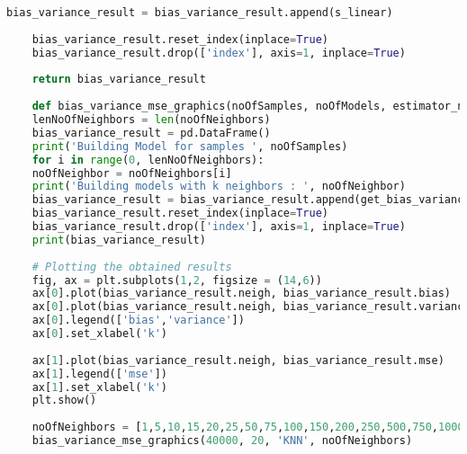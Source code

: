 \documentclass[a4paper]{article}
\begin{document}
\begin{appendices}
\begin{lstlisting}[language=Python]
	bias_variance_result = bias_variance_result.append(s_linear)
	
	bias_variance_result.reset_index(inplace=True)
	bias_variance_result.drop(['index'], axis=1, inplace=True)
	
	return bias_variance_result
	
	def bias_variance_mse_graphics(noOfSamples, noOfModels, estimator_name, noOfNeighbors) :
	lenNoOfNeighbors = len(noOfNeighbors)
	bias_variance_result = pd.DataFrame()
	print('Building Model for samples ', noOfSamples)
	for i in range(0, lenNoOfNeighbors):
	noOfNeighbor = noOfNeighbors[i]
	print('Building models with k neighbors : ', noOfNeighbor)
	bias_variance_result = bias_variance_result.append(get_bias_variance(40000,noOfModels, estimator_name, noOfNeighbor))
	bias_variance_result.reset_index(inplace=True)
	bias_variance_result.drop(['index'], axis=1, inplace=True)
	print(bias_variance_result)
	
	# Plotting the obtained results
	fig, ax = plt.subplots(1,2, figsize = (14,6))
	ax[0].plot(bias_variance_result.neigh, bias_variance_result.bias)
	ax[0].plot(bias_variance_result.neigh, bias_variance_result.variance)
	ax[0].legend(['bias','variance'])
	ax[0].set_xlabel('k')
	
	ax[1].plot(bias_variance_result.neigh, bias_variance_result.mse)
	ax[1].legend(['mse'])
	ax[1].set_xlabel('k')
	plt.show()
	
	noOfNeighbors = [1,5,10,15,20,25,50,75,100,150,200,250,500,750,1000,2000]
	bias_variance_mse_graphics(40000, 20, 'KNN', noOfNeighbors)
\end{lstlisting}

\end{appendices}

\newpage
\end{document}
